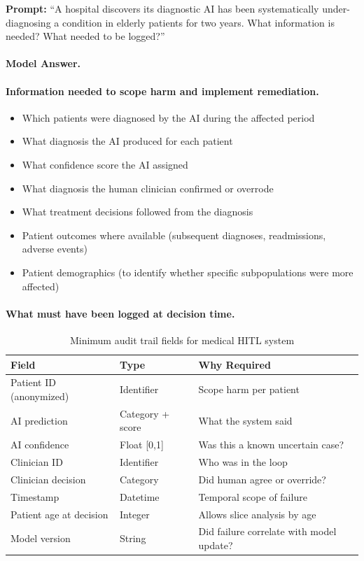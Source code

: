 \textbf{Prompt:} ``A hospital discovers its diagnostic AI has been systematically under-diagnosing a condition in elderly patients for two years. What information is needed? What needed to be logged?''

\paragraph{Model Answer.}

\paragraph{Information needed to scope harm and implement remediation.}

\begin{itemize}
    \item Which patients were diagnosed by the AI during the affected period
    \item What diagnosis the AI produced for each patient
    \item What confidence score the AI assigned
    \item What diagnosis the human clinician confirmed or overrode
    \item What treatment decisions followed from the diagnosis
    \item Patient outcomes where available (subsequent diagnoses, readmissions, adverse events)
    \item Patient demographics (to identify whether specific subpopulations were more affected)
\end{itemize}

\paragraph{What must have been logged at decision time.}

\begin{table}[htbp]
\caption{Minimum audit trail fields for medical HITL system}
\label{tab:medical-audit-fields}
\centering
\begin{tabular}{@{}p{4cm}p{3cm}p{4.5cm}@{}}
\toprule
\textbf{Field} & \textbf{Type} & \textbf{Why Required} \\
\midrule
Patient ID (anonymized) & Identifier & Scope harm per patient \\
AI prediction & Category + score & What the system said \\
AI confidence & Float [0,1] & Was this a known uncertain case? \\
Clinician ID & Identifier & Who was in the loop \\
Clinician decision & Category & Did human agree or override? \\
Timestamp & Datetime & Temporal scope of failure \\
Patient age at decision & Integer & Allows slice analysis by age \\
Model version & String & Did failure correlate with model update? \\
\bottomrule
\end{tabular}
\end{table}

